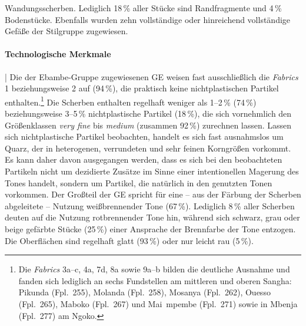 Wandungsscherben. Lediglich 18\,\% aller Stücke sind Randfragmente und 4\,\% Bodenstücke. Ebenfalls wurden zehn vollständige oder hinreichend vollständige Gefäße der Stilgruppe zugewiesen.

\paragraph{Technologische Merkmale}\hspace{-.5em}|\hspace{.5em}%
Die der Ebambe-Gruppe zugewiesenen GE weisen fast ausschließlich die \textit{Fabrics} 1 beziehungsweise 2 auf (94\,\%), die praktisch keine nichtplastischen Partikel enthalten.\footnote{Die \textit{Fabrics} 3a--c, 4a, 7d, 8a sowie 9a--b bilden die deutliche  Ausnahme und fanden sich lediglich an sechs Fundstellen am mittleren und oberen \mbox{Sangha}: Pikunda (Fpl.~255), Molanda (Fpl.~258), Mosanya (Fpl.~262), Ouesso (Fpl.~265), Maboko (Fpl.~267) und Mai~mpembe (Fpl.~271) sowie in Mbenja (Fpl.~277) am \mbox{Ngoko}.} Die Scherben enthalten regelhaft weniger als 1--2\,\% (74\,\%) beziehungsweise 3--5\,\% nichtplastische Partikel (18\,\%), die sich vornehmlich den Größenklassen \textit{very fine} bis \textit{medium} (zusammen 92\,\%) zurechnen lassen. Lassen sich nichtplastische Partikel beobachten, handelt es sich fast ausnahmslos um Quarz, der in heterogenen, verrundeten und sehr feinen Korngrößen vorkommt. Es kann daher davon ausgegangen werden, dass es sich bei den beobachteten Partikeln nicht um dezidierte Zusätze im Sinne einer intentionellen Magerung des Tones handelt, sondern um Partikel, die natürlich in den genutzten Tonen vorkommen. Der Großteil der GE spricht für eine -- aus der Färbung der Scherben abgeleitete -- Nutzung weißbrennender Tone (67\,\%). Lediglich 8\,\% aller Scherben deuten auf die Nutzung rotbrennender Tone hin, während sich schwarz, grau oder beige gefärbte Stücke (25\,\%) einer Ansprache der Brennfarbe der Tone entzogen. Die Oberflächen sind regelhaft glatt (93\,\%) oder nur leicht rau (5\,\%).

